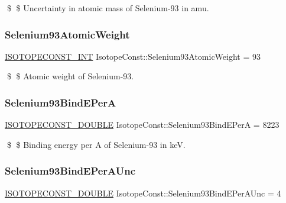 \$ \$ Uncertainty in atomic mass of Selenium-\/93 in amu. \mbox{\label{group___isotope_const-_selenium-_se93_ga69d9921d7ca2c286dee64894a48c408c}} 
\subsubsection{\texorpdfstring{Selenium93\+Atomic\+Weight}{Selenium93AtomicWeight}}
{\footnotesize\ttfamily \mbox{\hyperlink{group___isotope_const-_macros_ga5f18360b3e99483a35c32d789e62621c}{I\+S\+O\+T\+O\+P\+E\+C\+O\+N\+S\+T\+\_\+\+I\+NT}} Isotope\+Const\+::\+Selenium93\+Atomic\+Weight = 93}

\$ \$ Atomic weight of Selenium-\/93. \mbox{\label{group___isotope_const-_selenium-_se93_gacae90ccdf54b8f13d7a4254d5fddc8ef}} 
\subsubsection{\texorpdfstring{Selenium93\+Bind\+E\+PerA}{Selenium93BindEPerA}}
{\footnotesize\ttfamily \mbox{\hyperlink{group___isotope_const-_macros_ga8f45a7272ce02c0b4c65c44636ed719a}{I\+S\+O\+T\+O\+P\+E\+C\+O\+N\+S\+T\+\_\+\+D\+O\+U\+B\+LE}} Isotope\+Const\+::\+Selenium93\+Bind\+E\+PerA = 8223}

\$ \$ Binding energy per A of Selenium-\/93 in keV. \mbox{\label{group___isotope_const-_selenium-_se93_gaae6f68f47872c79a4d97a3b67b945a2e}} 
\subsubsection{\texorpdfstring{Selenium93\+Bind\+E\+Per\+A\+Unc}{Selenium93BindEPerAUnc}}
{\footnotesize\ttfamily \mbox{\hyperlink{group___isotope_const-_macros_ga8f45a7272ce02c0b4c65c44636ed719a}{I\+S\+O\+T\+O\+P\+E\+C\+O\+N\+S\+T\+\_\+\+D\+O\+U\+B\+LE}} Isotope\+Const\+::\+Selenium93\+Bind\+E\+Per\+A\+Unc = 4}

